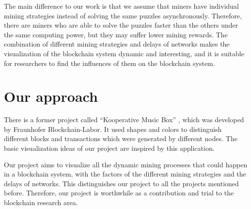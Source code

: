 The main difference to our work is that we assume that miners have individual mining strategies instead of solving the same puzzles asynchronously. Therefore, there are miners who are able to solve the puzzles faster than the others under the same computing power, but they may suffer lower mining rewards. The combination of different mining strategies and delays of networks makes the visualization of the blockchain system dynamic and interesting, and it is suitable for researchers to find the influences of them on the blockchain system.

\section{Our approach}

There is a former project called “Kooperative Music Box” \cite{musicbox}, which was developed by Fraunhofer Blockchain-Labor. It used shapes and colors to distinguish different blocks and transactions which were generated by different nodes. The basic visualization ideas of our project are inspired by this application.

Our project aims to visualize all the dynamic mining processes that could happen in a blockchain system, with the factors of the different mining strategies and the delays of networks. This distinguishes our project to all the projects mentioned before. Therefore, our project is worthwhile as a contribution and trial to the blockchain research area.
